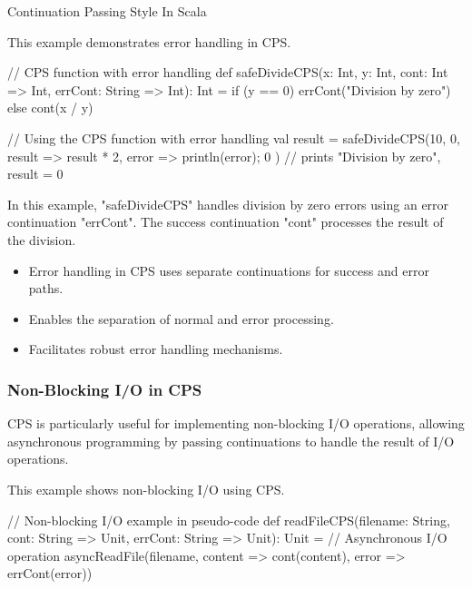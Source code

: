 \begin{notes}{Continuation Passing Style In Scala}
    \begin{highlight}
    
        This example demonstrates error handling in CPS.
    
    \begin{code}[Scala]
    // CPS function with error handling
    def safeDivideCPS(x: Int, y: Int, cont: Int => Int, errCont: String => Int): Int =
        if (y == 0) errCont("Division by zero")
        else cont(x / y)
    
    // Using the CPS function with error handling
    val result = safeDivideCPS(10, 0, result => result * 2, error => { println(error); 0 })  // prints "Division by zero", result = 0
    \end{code}
    
        In this example, "safeDivideCPS" handles division by zero errors using an error continuation "errCont". The success continuation "cont" processes the result of the division.
    
        \begin{itemize}
            \item Error handling in CPS uses separate continuations for success and error paths.
            \item Enables the separation of normal and error processing.
            \item Facilitates robust error handling mechanisms.
        \end{itemize}
    
    \end{highlight}
    
    \subsubsection*{Non-Blocking I/O in CPS}
    
    CPS is particularly useful for implementing non-blocking I/O operations, allowing asynchronous programming by passing continuations to handle the result of I/O operations.
    
    \begin{highlight}
    
        This example shows non-blocking I/O using CPS.
    
    \begin{code}[Scala]
    // Non-blocking I/O example in pseudo-code
    def readFileCPS(filename: String, cont: String => Unit, errCont: String => Unit): Unit = {
        // Asynchronous I/O operation
        asyncReadFile(filename, content => cont(content), error => errCont(error))
    }
    

\end{code}
\end{highlight}
\end{notes}

